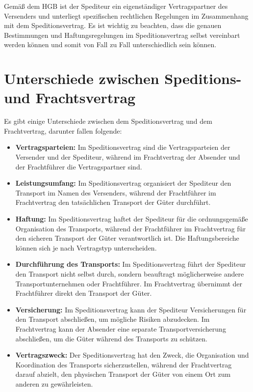     Gemäß dem HGB ist der Spediteur ein eigenständiger Vertragspartner des Versenders und unterliegt spezifischen rechtlichen Regelungen im Zusammenhang mit dem Speditionsvertrag. 
    Es ist wichtig zu beachten, dass die genauen Bestimmungen und Haftungsregelungen im Speditionsvertrag selbst vereinbart werden können und somit von Fall zu Fall unterschiedlich sein können.
    
    \section{Unterschiede zwischen Speditions- und Frachtsvertrag}
    Es gibt einige Unterschiede zwischen dem Speditionsvertrag und dem Frachtvertrag, darunter fallen folgende:\nl

    \begin{itemize}
        \item \textbf{Vertragsparteien:} Im Speditionsvertrag sind die Vertragsparteien der Versender und der Spediteur, während im Frachtvertrag der Absender und der Frachtführer die Vertragspartner sind.
        \item \textbf{Leistungsumfang:} Im Speditionsvertrag organisiert der Spediteur den Transport im Namen des Versenders, während der Frachtführer im Frachtvertrag den tatsächlichen Transport der Güter durchführt.
        \item \textbf{Haftung:} Im Speditionsvertrag haftet der Spediteur für die ordnungsgemäße Organisation des Transports, während der Frachtführer im Frachtvertrag für den sicheren Transport der Güter verantwortlich ist. Die Haftungsbereiche können sich je nach Vertragstyp unterscheiden.
        \item \textbf{Durchführung des Transports:} Im Speditionsvertrag führt der Spediteur den Transport nicht selbst durch, sondern beauftragt möglicherweise andere Transportunternehmen oder Frachtführer. Im Frachtvertrag übernimmt der Frachtführer direkt den Transport der Güter.
        \item \textbf{Versicherung:} Im Speditionsvertrag kann der Spediteur Versicherungen für den Transport abschließen, um mögliche Risiken abzudecken. Im Frachtvertrag kann der Absender eine separate Transportversicherung abschließen, um die Güter während des Transports zu schützen.
        \item \textbf{Vertragszweck:} Der Speditionsvertrag hat den Zweck, die Organisation und Koordination des Transports sicherzustellen, während der Frachtvertrag darauf abzielt, den physischen Transport der Güter von einem Ort zum anderen zu gewährleisten.
    \end{itemize}

